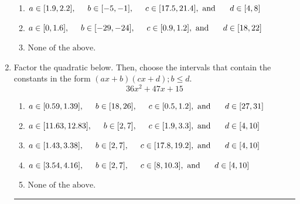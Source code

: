 \documentclass[14pt]{extbook}
\newcommand{\litem}[1]{\item#1\hspace*{-1cm}\rule{\textwidth}{0.4pt}}
\begin{document}
\begin{enumerate}
{\begin{enumerate}[label=\Alph*.]
\item \( a \in [1.9, 2.2], \hspace*{5mm} b \in [-5, -1], \hspace*{5mm} c \in [17.5, 21.4], \text{ and } \hspace*{5mm} d \in [4, 8] \)
\item \( a \in [0, 1.6], \hspace*{5mm} b \in [-29, -24], \hspace*{5mm} c \in [0.9, 1.2], \text{ and } \hspace*{5mm} d \in [18, 22] \)
\item \( \text{None of the above.} \)

\end{enumerate} }
\litem{
Factor the quadratic below. Then, choose the intervals that contain the constants in the form $(ax+b)(cx+d); b \leq d.$\[ 36x^{2} +47 x + 15 \]\begin{enumerate}[label=\Alph*.]
\item \( a \in [0.59, 1.39], \hspace*{5mm} b \in [18, 26], \hspace*{5mm} c \in [0.5, 1.2], \text{ and } \hspace*{5mm} d \in [27, 31] \)
\item \( a \in [11.63, 12.83], \hspace*{5mm} b \in [2, 7], \hspace*{5mm} c \in [1.9, 3.3], \text{ and } \hspace*{5mm} d \in [4, 10] \)
\item \( a \in [1.43, 3.38], \hspace*{5mm} b \in [2, 7], \hspace*{5mm} c \in [17.8, 19.2], \text{ and } \hspace*{5mm} d \in [4, 10] \)
\item \( a \in [3.54, 4.16], \hspace*{5mm} b \in [2, 7], \hspace*{5mm} c \in [8, 10.3], \text{ and } \hspace*{5mm} d \in [4, 10] \)
\item \( \text{None of the above.} \)


\end{enumerate}}
\end{enumerate}
\end{document}
